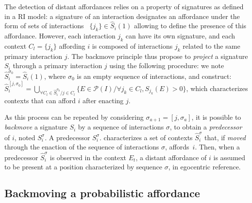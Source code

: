\documentclass[conference]{IEEEtran}
\begin{document}
The detection of distant affordances relies on a property of signatures as defined in a RI model: a signature of an interaction designates an affordance under the form of sets of interactions ~$\{j_k\} \in \hat{S}_i(1)$ allowing to define the presence of this affordance.
However, each interaction $j_k$ can have its own signature, and each context $C_l=\{j_k\}$ affording $i$ is composed of interactions $j_k$ related to the same primary interaction $j$. The backmove principle thus propose to \textit{project} a signature $S_i$ through a primary interaction $j$ using the following procedure: we note $\hat{S}_i^{\sigma_0} = \hat{S}_i(1)$, where $\sigma_0$ is an empty sequence of interactions, and construct:
$\hat{S}_i^{[j,\sigma_0]}\!=\!\bigcup_{\forall C_l \in \hat{S}_i^{\sigma_0} / j \in C_l} \{E \in \mathcal{P}(I) / \forall j_k \in C_l, S_{j_k}(E)\!>\!0\}$, which characterizes contexts that can afford $i$ after enacting $j$.

As this process can be repeated by considering $\sigma_{a+1}=[j,\sigma_a]$, it is possible to \textit{backmove} a signature $S_i$ by a sequence of interactions $\sigma$, to obtain a \textit{predecessor} of $i$, noted $S_i^\sigma$. A predecessor $S_i^\sigma$. characterizes a set of contexts $\hat{S}_i^\sigma$ that, if \textit{moved} through the enaction of the sequence of interactions $\sigma$, affords~$i$. Then, when a predecessor $\hat{S}_i^\sigma$ is observed in the context $E_t$, a distant affordance of $i$ is assumed to be present at a position characterized by sequence $\sigma$, in egocentric reference.



\subsection{Backmoving a probabilistic affordance}
\end{document}
